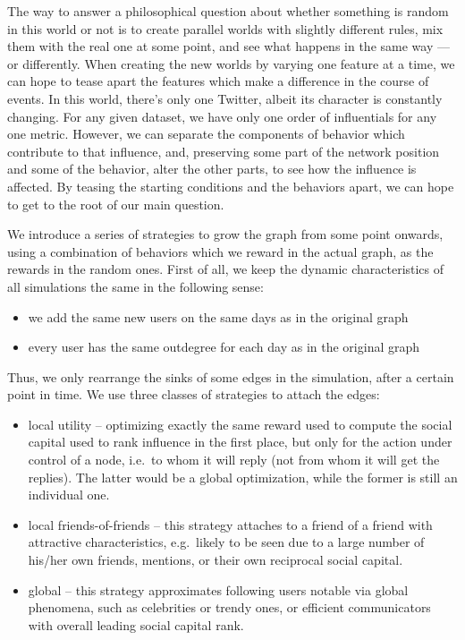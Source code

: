 \documentclass[10pt,oneside]{memoir}
\begin{document}
The way to answer a philosophical question about whether something is random in this world or not is to create parallel worlds with slightly different rules, mix them with the real one at some point, and see what happens in the same way --- or differently.  When creating the new worlds by varying one feature at a time, we can hope to tease apart the features which make a difference in the course of events.  In this world, there's only one Twitter, albeit its character is constantly changing.  For any given dataset, we have only one order of influentials for any one metric.  However, we can separate the components of behavior which contribute to that influence, and, preserving some part of the network position and some of the behavior, alter the other parts, to see how the influence is affected.  By teasing the starting conditions and the behaviors apart, we can hope to get to the root of our main question.


We introduce a series of strategies to grow the graph from some point onwards, using a combination of behaviors which we reward in the actual graph, as the rewards in the random ones.  First of all, we keep the dynamic characteristics of all simulations the same in the following sense:


\begin{itemize}


\item we add the same new users on the same days as in the original graph

\item every user has the same outdegree for each day as in the original graph
\end{itemize}

Thus, we only rearrange the sinks of some edges in the simulation, after a certain point in time.  We use three classes of strategies to attach the edges:


\begin{itemize}


\item local utility -- optimizing exactly the same reward used to compute the social capital used to rank influence in the first place, but only for the action under control of a node, i.e.\ to whom it will reply (not from whom it will get the replies).  The latter would be a global optimization, while the former is still an individual one.

\item local friends-of-friends -- this strategy attaches to a friend of a friend with attractive characteristics, e.g.\ likely to be seen due to a large number of his/her own friends, mentions, or their own reciprocal social capital.

\item global -- this strategy approximates following users notable via global phenomena, such as celebrities or trendy ones, or efficient communicators with overall leading social capital rank.
\end{itemize}
\end{document}
